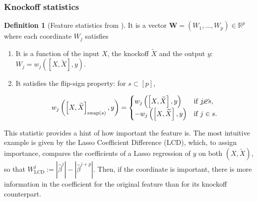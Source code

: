 \documentclass{article}
\theoremstyle{plain}
\theoremstyle{definition}
\newtheorem{definition}[theorem]{Definition}
\theoremstyle{remark}
\begin{document}
\subsubsection{Knockoff statistics}\label{app:ko_stat}


\begin{definition}[Feature statistics from \cite{candes2018panning}] It is a vector $\mathbf{W}=(W_1, \ldots, W_p)\in \mathbb{R}^p$ where each coordinate $W_j$ satisfies
\begin{enumerate}
    \item It is a function of the input $X$, the knockoff $\widetilde{X}$ and the output $y$: $W_j=w_j\left(\left[X, \widetilde{X}\right], y\right)$.
    \item It satisfies the flip-sign property: for $s\subset[p]$,
    
    
\[
w_j\left(\left[X, \widetilde{X}\right]_{\mathrm{swap}(s)}, y\right) = 
\begin{cases} 
    w_j\left(\left[X, \widetilde{X}\right], y\right) & \text{if } j\cancel{\in} s,  \\
   -w_j\left(\left[X, \widetilde{X}\right], y\right) & \text{if } j\in s.
\end{cases}
\]
\end{enumerate}
\label{def:knock-statistic}
\end{definition}

This statistic provides a hint of how important the feature is. The most intuitive example is given by the Lasso Coefficient Difference (LCD), which, to assign importance, compares the coefficients of a Lasso regression of $y$ on both $(X, \widetilde{X})$, so that $W^j_{\mathrm{LCD}} := |\hat{\beta}^j| - |\hat{\beta}^{j+p}|$. Then, if the coordinate is important, there is more information in the coefficient for the original feature than for its knockoff counterpart.


 
\end{document}
